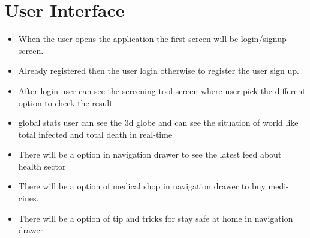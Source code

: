 \section*{User Interface}
\begin{itemize}
    \item When the user opens the application the first screen will be login/signup screen.
\item Already registered then the user login otherwise to register the user sign up.
\item After login user can see the screening tool screen where user pick the different option to check the result
\item global stats user can see the 3d globe and can see the situation of world like total infected and total death in real-time
\item There will be a option in navigation drawer to see the latest feed about health sector
\item There will be a option of medical shop in navigation drawer to buy medi-cines.
\item There will be a option of tip and tricks for stay safe at home in navigation drawer
\end{itemize}

